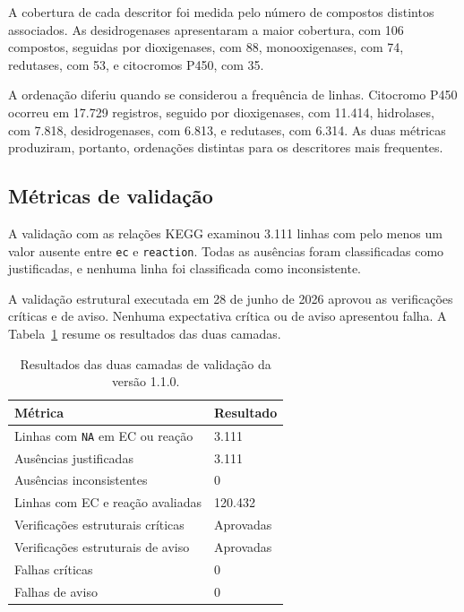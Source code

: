 A cobertura de cada descritor foi medida pelo número de compostos distintos
associados. As desidrogenases apresentaram a maior cobertura, com
106 compostos, seguidas por dioxigenases, com 88, monooxigenases, com 74,
redutases, com 53, e citocromos P450, com 35.

A ordenação diferiu quando se considerou a frequência de linhas. Citocromo
P450 ocorreu em 17.729 registros, seguido por dioxigenases, com 11.414,
hidrolases, com 7.818, desidrogenases, com 6.813, e redutases, com 6.314.
As duas métricas produziram, portanto, ordenações distintas para os
descritores mais frequentes.

\subsection{Métricas de validação}

A validação com as relações KEGG examinou 3.111 linhas com pelo menos um valor
ausente entre \texttt{ec} e \texttt{reaction}. Todas as ausências foram
classificadas como justificadas, e nenhuma linha foi classificada como
inconsistente.


A validação estrutural executada em 28 de junho de 2026 aprovou as verificações
críticas e de aviso. Nenhuma expectativa crítica ou de aviso apresentou
falha. A Tabela~\ref{tab:c1-validation-metrics} resume os resultados das duas
camadas.

\begin{table}[htbp]
\centering
\caption{Resultados das duas camadas de validação da versão 1.1.0.}
\label{tab:c1-validation-metrics}
\small
\begin{tabular}{@{}ll@{}}
\toprule
\textbf{Métrica} & \textbf{Resultado} \\
\midrule
Linhas com \texttt{NA} em EC ou reação
& 3.111 \\

Ausências justificadas
& 3.111 \\

Ausências inconsistentes
& 0 \\

Linhas com EC e reação avaliadas
& 120.432 \\

Verificações estruturais críticas
& Aprovadas \\

Verificações estruturais de aviso
& Aprovadas \\

Falhas críticas
& 0 \\

Falhas de aviso
& 0 \\
\bottomrule
\end{tabular}
\end{table}

